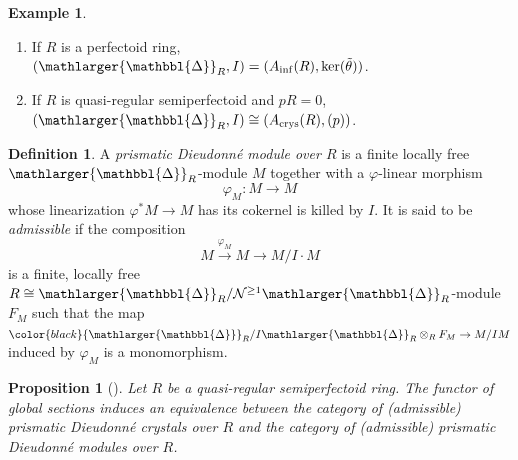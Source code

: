 \documentclass{amsart}
\newcommand{\prism}{{\mathlarger{\mathbbl{\Delta}}}}
\theoremstyle{plain}
\newtheorem{proposition}[theorem]{Proposition}
\theoremstyle{definition}
\newtheorem{definition}[theorem]{Definition}
\newtheorem{example}[theorem]{Example}
\newcommand{\red}[1]{{\color{black} #1}}
\newcommand{\green}[1]{{\color{black}#1}}
\newcommand{\blue}[1]{{\color{black}#1}}
\begin{document}
\begin{example}
\begin{enumerate}
\item If $R$ is a perfectoid ring, $(\prism_R,I)=(A_{\rm inf}(R),\ker(\tilde{\theta}))$. 
\item If $R$ is quasi-regular semiperfectoid and $pR=0$, $(\prism_R,I) \cong (A_{\rm crys}(R),(p))$. 
\end{enumerate}
\end{example}

\begin{definition}
A \textit{prismatic Dieudonn\'e module over $R$} is a finite locally free $\prism_R$-module $M$ together with a $\varphi$-linear morphism
  $$
  \varphi_M \colon M\to M
  $$
  whose linearization $\varphi^\ast M \to M$ has its cokernel is killed by $I$. It is said to be \textit{admissible} if the composition
  \[
    M\xrightarrow{\varphi_M}M\to M/I\cdot M
  \]
  \blue{is a finite, locally free $R\cong \prism_R/\mathcal{N}^{\geq 1}\prism_R$-module $F_M$ such that the map $\green{\prism_R/I\prism_R} \otimes_{R} F_M \to M/IM$ induced by $\varphi_{M}$ is a monomorphism.}
\end{definition}

\begin{proposition}[]
Let $R$ be a quasi-regular semiperfectoid ring. The functor of global sections induces an equivalence between the category of \red{(admissible)} prismatic Dieudonn\'e crystals over $R$ and the category of \red{(admissible)} prismatic Dieudonn\'e modules over $R$.
\end{proposition}
\end{document}
